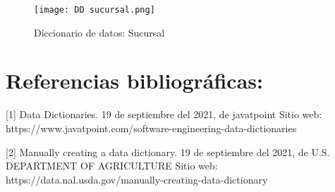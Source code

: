 \documentclass[titlepage, 12pt]{article}
\begin{document}
    \begin{figure}[h]
    \caption{Diccionario de datos: Sucursal}
    \centering
    \texttt{[image: DD sucursal.png]} \par\vspace{0.5cm}
    \end{figure}

\section{Referencias bibliográficas:}

[1] Data Dictionaries. 19 de septiembre del 2021, de javatpoint Sitio web: https://www.javatpoint.com/software-engineering-data-dictionaries \par\vspace{0.5cm}

[2] Manually creating a data dictionary. 19 de septiembre del 2021, de U.S. DEPARTMENT OF AGRICULTURE Sitio web: https://data.nal.usda.gov/manually-creating-data-dictionary
\end{document}
